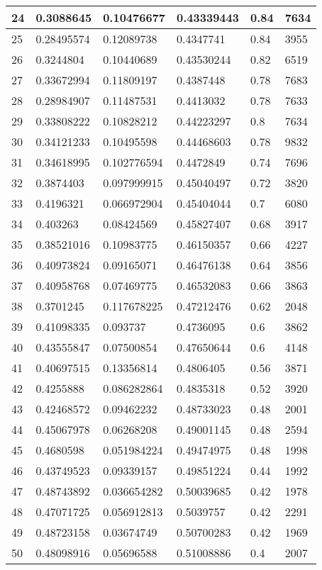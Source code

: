 \begin{longtable}{|l|l|l|l|l|l|}
24 & 0.3088645 & 0.10476677 & 0.43339443 & 0.84 & 7634 \\ \hline 
25 & 0.28495574 & 0.12089738 & 0.4347741 & 0.84 & 3955 \\ \hline 
26 & 0.3244804 & 0.10440689 & 0.43530244 & 0.82 & 6519 \\ \hline 
27 & 0.33672994 & 0.11809197 & 0.4387448 & 0.78 & 7683 \\ \hline 
28 & 0.28984907 & 0.11487531 & 0.4413032 & 0.78 & 7633 \\ \hline 
29 & 0.33808222 & 0.10828212 & 0.44223297 & 0.8 & 7634 \\ \hline 
30 & 0.34121233 & 0.10495598 & 0.44468603 & 0.78 & 9832 \\ \hline 
31 & 0.34618995 & 0.102776594 & 0.4472849 & 0.74 & 7696 \\ \hline 
32 & 0.3874403 & 0.097999915 & 0.45040497 & 0.72 & 3820 \\ \hline 
33 & 0.4196321 & 0.066972904 & 0.45404044 & 0.7 & 6080 \\ \hline 
34 & 0.403263 & 0.08424569 & 0.45827407 & 0.68 & 3917 \\ \hline 
35 & 0.38521016 & 0.10983775 & 0.46150357 & 0.66 & 4227 \\ \hline 
36 & 0.40973824 & 0.09165071 & 0.46476138 & 0.64 & 3856 \\ \hline 
37 & 0.40958768 & 0.07469775 & 0.46532083 & 0.66 & 3863 \\ \hline 
38 & 0.3701245 & 0.117678225 & 0.47212476 & 0.62 & 2048 \\ \hline 
39 & 0.41098335 & 0.093737 & 0.4736095 & 0.6 & 3862 \\ \hline 
40 & 0.43555847 & 0.07500854 & 0.47650644 & 0.6 & 4148 \\ \hline 
41 & 0.40697515 & 0.13356814 & 0.4806405 & 0.56 & 3871 \\ \hline 
42 & 0.4255888 & 0.086282864 & 0.4835318 & 0.52 & 3920 \\ \hline 
43 & 0.42468572 & 0.09462232 & 0.48733023 & 0.48 & 2001 \\ \hline 
44 & 0.45067978 & 0.06268208 & 0.49001145 & 0.48 & 2594 \\ \hline 
45 & 0.4680598 & 0.051984224 & 0.49474975 & 0.48 & 1998 \\ \hline 
46 & 0.43749523 & 0.09339157 & 0.49851224 & 0.44 & 1992 \\ \hline 
47 & 0.48743892 & 0.036654282 & 0.50039685 & 0.42 & 1978 \\ \hline 
48 & 0.47071725 & 0.056912813 & 0.5039757 & 0.42 & 2291 \\ \hline 
49 & 0.48723158 & 0.03674749 & 0.50700283 & 0.42 & 1969 \\ \hline 
50 & 0.48098916 & 0.05696588 & 0.51008886 & 0.4 & 2007 \\ \hline 
\end{longtable}